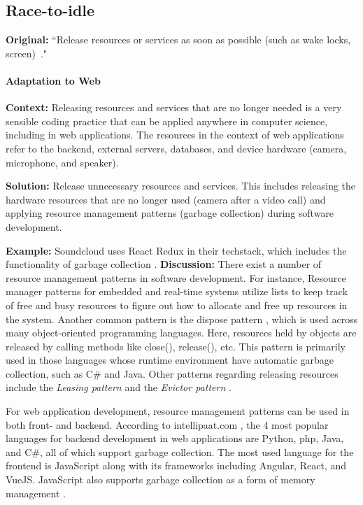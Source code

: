 

\subsection{Race-to-idle}\label{sec:patterns-RaceToIdle}
\textbf{Original:} ``Release resources or services as soon as possible (such as wake locks, screen)~\cite{cruz2019catalog}."

\paragraph{Adaptation to Web}\mbox{}

\textbf{Context:} Releasing resources and services that are no longer needed is a very sensible coding practice that can be applied anywhere in computer science, including in web applications. The resources in the context of web applications refer to the backend, external servers, databases, and device hardware (\eg camera, microphone, and speaker).

\textbf{Solution:} Release unnecessary resources and services. This includes releasing the hardware resources that are no longer used (\eg camera after a video call) and applying resource management patterns (\eg garbage collection) during software development.

\textbf{Example:} Soundcloud uses React Redux in their techstack, which includes the functionality of garbage collection \cite{Garbagecollect}.
\textbf{Discussion:} There exist a number of resource management patterns in software development. For instance, Resource manager patterns \cite{design_pattern_resource_manager} for embedded and real-time systems utilize lists to keep track of free and busy resources to figure out how to allocate and free up resources in the system. Another common pattern is the dispose pattern \cite{wikipedia_dispose_pattern}, which is used across many object-oriented programming languages. Here, resources held by objects are released by calling methods like close(), release(), etc. This pattern is primarily used in those languages whose runtime environment have automatic garbage collection, such as C\# and Java. Other patterns regarding releasing resources include the \emph{Leasing pattern} and the \emph{Evictor pattern} \cite{resource_manager_patterns}.

For web application development, resource management patterns can be used in both front- and backend. According to intellipaat.com \cite{best-web-dev-languages}, the 4 most popular languages for backend development in web applications are Python, php, Java, and C\#, all of which support garbage collection. The most used language for the frontend is JavaScript along with its frameworks including Angular, React, and VueJS. JavaScript also supports garbage collection as a form of memory management \cite{dev_mozilla_memory_management}.

